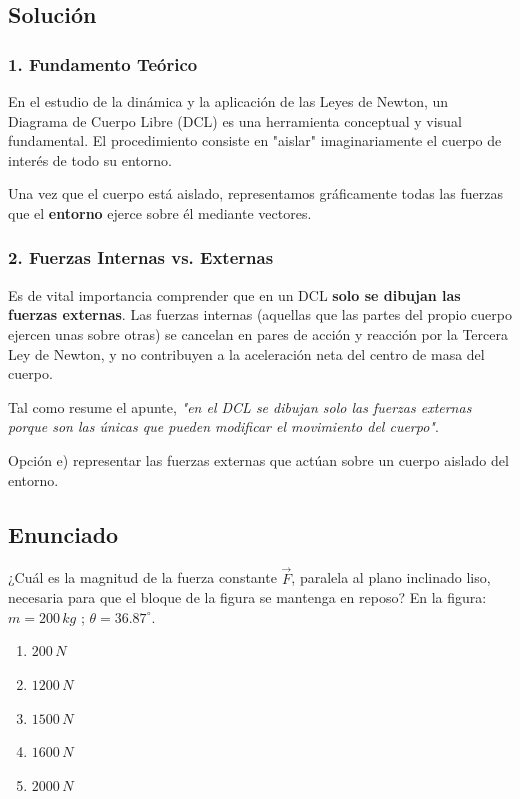 \documentclass[12pt, a4paper]{article}
\begin{document}
\subsection*{Solución}

\subsubsection*{1. Fundamento Teórico}
En el estudio de la dinámica y la aplicación de las Leyes de Newton, un Diagrama de Cuerpo Libre (DCL) es una herramienta conceptual y visual fundamental. El procedimiento consiste en "aislar" imaginariamente el cuerpo de interés de todo su entorno.

Una vez que el cuerpo está aislado, representamos gráficamente todas las fuerzas que el \textbf{entorno} ejerce sobre él mediante vectores.

\subsubsection*{2. Fuerzas Internas vs. Externas}
Es de vital importancia comprender que en un DCL \textbf{solo se dibujan las fuerzas externas}. Las fuerzas internas (aquellas que las partes del propio cuerpo ejercen unas sobre otras) se cancelan en pares de acción y reacción por la Tercera Ley de Newton, y no contribuyen a la aceleración neta del centro de masa del cuerpo.

Tal como resume el apunte, \textit{"en el DCL se dibujan solo las fuerzas externas porque son las únicas que pueden modificar el movimiento del cuerpo"}.

\begin{tcolorbox}[colback=green!5!white, colframe=green!50!black, title=Respuesta Final]
\centering Opción e) representar las fuerzas externas que actúan sobre un cuerpo aislado del entorno.
\end{tcolorbox}

\newpage

\subsection*{Enunciado}
¿Cuál es la magnitud de la fuerza constante $\vec{F}$, paralela al plano inclinado liso, necesaria para que el bloque de la figura se mantenga en reposo? En la figura: $m = 200 \, \si{kg}$ ; $\theta = 36.87^\circ$.
\begin{enumerate}[label=\alph*)]
    \item $200 \, \si{N}$
    \item $1200 \, \si{N}$
    \item $1500 \, \si{N}$
    \item $1600 \, \si{N}$
    \item $2000 \, \si{N}$
\end{enumerate}
\end{document}
